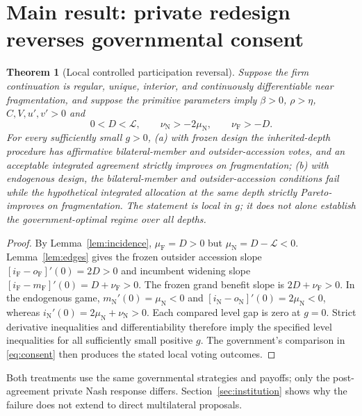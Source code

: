 \documentclass[11pt,a4paper]{article}
\newtheorem{theorem}{Theorem}
\theoremstyle{remark}\newtheorem{remark}[theorem]{Remark}
\newcommand{\N}{\mathrm{N}}\newcommand{\F}{\mathrm{F}}
\newcommand{\loss}{\mathcal L}\newcommand{\vect}[1]{\boldsymbol{#1}}
\begin{document}
\section{Main result: private redesign reverses governmental consent}\label{sec:global}
\begin{theorem}[Local controlled participation reversal]\label{thm:local}
Suppose the firm continuation is regular, unique, interior, and continuously differentiable near fragmentation, and suppose the primitive parameters imply $\beta>0$, $\rho>\eta$, $C,V,u',v'>0$ and
\begin{equation}\label{eq:conditions}
0<D<\loss,\qquad \nu_{\N}>-2\mu_{\N},\qquad \nu_{\F}>-D.
\end{equation}
For every sufficiently small $g>0$, (a) with frozen design the inherited-depth procedure has affirmative bilateral-member and outsider-accession votes, and an acceptable integrated agreement strictly improves on fragmentation; (b) with endogenous design, the bilateral-member and outsider-accession conditions fail while the hypothetical integrated allocation at the same depth strictly Pareto-improves on fragmentation. The statement is local in $g$; it does not alone establish the government-optimal regime over all depths.
\end{theorem}
\begin{proof}
By Lemma~\ref{lem:incidence}, $\mu_{\F}=D>0$ but $\mu_{\N}=D-\loss<0$. Lemma~\ref{lem:edges} gives the frozen outsider accession slope $[i_{\F}-o_{\F}]'(0)=2D>0$ and incumbent widening slope $[i_{\F}-m_{\F}]'(0)=D+\nu_{\F}>0$. The frozen grand benefit slope is $2D+\nu_{\F}>0$. In the endogenous game, $m_{\N}'(0)=\mu_{\N}<0$ and $[i_{\N}-o_{\N}]'(0)=2\mu_{\N}<0$, whereas $i_{\N}'(0)=2\mu_{\N}+\nu_{\N}>0$. Each compared level gap is zero at $g=0$. Strict derivative inequalities and differentiability therefore imply the specified level inequalities for all sufficiently small positive $g$. The government's comparison in \eqref{eq:consent} then produces the stated local voting outcomes.
\end{proof}

Both treatments use the same governmental strategies and payoffs; only the post-agreement private Nash response differs. Section~\ref{sec:institution} shows why the failure does not extend to direct multilateral proposals.
\end{document}
